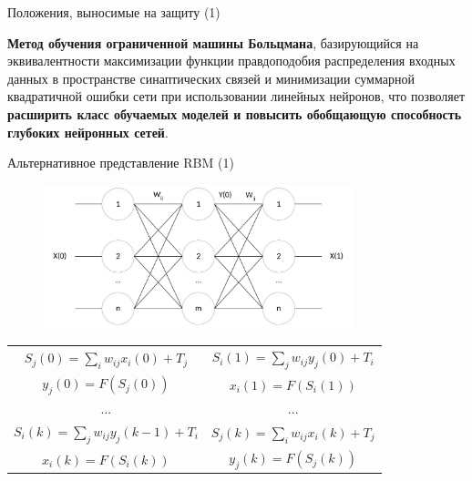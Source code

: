 \documentclass[10pt]{beamer}
\begin{document}
        \begin{frame}{Положения, выносимые на защиту (1)}
            \begin{block}{1}
                \large
                \textbf{Метод обучения ограниченной машины Больцмана}, базирующийся на эквивалентности максимизации функции правдоподобия распределения входных данных в пространстве синаптических связей и минимизации суммарной квадратичной ошибки сети при использовании линейных нейронов, что позволяет \textbf{расширить класс обучаемых моделей и повысить обобщающую способность глубоких нейронных сетей}.
            \end{block}
        \end{frame}

        \begin{frame}{Альтернативное представление RBM (1)}
            \begin{figure}[H]
                \centering
                \includegraphics[width=0.8\textwidth]{pic2-1.pdf}
            \end{figure}
            \begin{center}
                \begin{tabular}{c|c}
                    $S_j(0)=\sum_i w_{ij}x_i(0)+T_j$ & $S_i(1)=\sum_j w_{ij}y_j(0)+T_i$ \\
                    $y_j(0)=F(S_j(0))$ &
                    $x_i(1)=F(S_i(1))$
                    \\
                    \hline
                    ... & ...\\
                    \hline
                    $S_i(k)=\sum_j w_{ij}y_j(k-1)+T_i$ & $S_j(k)=\sum_i w_{ij}x_i(k)+T_j$ \\
                    $x_i(k)=F(S_i(k))$ &
                    $y_j(k)=F(S_j(k))$
                \end{tabular}
            \end{center}
        \end{frame}
\end{document}
